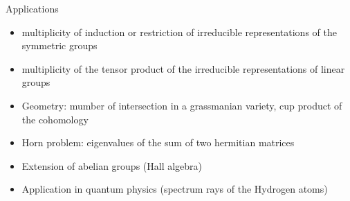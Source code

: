 \documentclass{beamer}
\begin{document}

\begin{frame}{Applications}
  \begin{itemize}
  \item multiplicity of induction or restriction of irreducible representations
    of the symmetric groups
  \item multiplicity of the tensor product of the irreducible representations
    of linear groups
  \item Geometry: mumber of intersection in a grassmanian variety, cup product
    of the cohomology
  \item Horn problem: eigenvalues of the sum of two hermitian matrices
  \item Extension of abelian groups (Hall algebra)
  \item Application in quantum physics (spectrum rays of the Hydrogen atoms)
  \end{itemize}
\end{frame}
\end{document}
